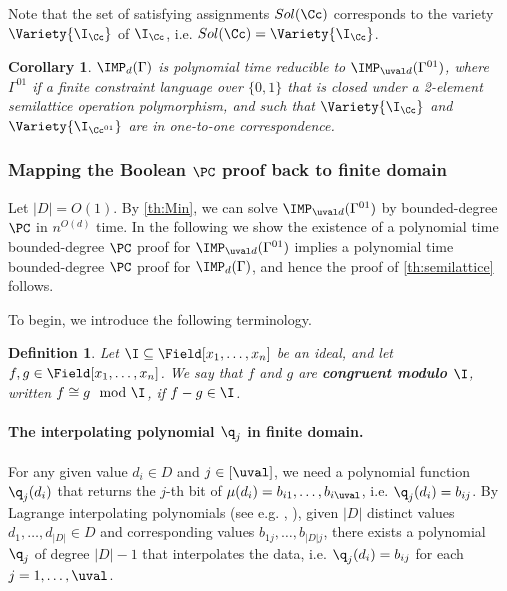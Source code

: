 \documentclass[11pt]{article}
\newtheorem{definition}[theorem]{Definition}
\newtheorem{corollary}[theorem]{Corollary}
\begin{document}
%
Note that the set of satisfying assignments $Sol(\Cc)$ corresponds to the variety $\Variety{\I_\Cc}$ of $\I_\Cc$, i.e. $Sol(\Cc)=\Variety{\I_\Cc}$. 
\begin{corollary}\label{th:imp_red}
 $\IMP_d(\Gamma)$ is polynomial time reducible to $\IMP_{\uval d}(\Gamma^{01})$, where $\Gamma^{01}$ if a finite constraint language over $\{0, 1\}$ that is closed under  a 2-element semilattice operation polymorphism, and such that $\Variety{\I_\Cc}$ and $\Variety{\I_{\Cc^{01}}}$ are in one-to-one correspondence. 
\end{corollary}

\subsubsection[Mapping the Boolean PC proof back to finite domain]{Mapping the Boolean $\PC$ proof back to finite domain}\label{sect:mappingBack}
Let $|D|=O(1)$. By \cref{th:Min}, we can solve $\IMP_{\uval d}(\Gamma^{01})$ by bounded-degree $\PC$ in $n^{O(d)}$ time. In the following we show the existence of a polynomial time bounded-degree $\PC$ proof for $\IMP_{\uval d}(\Gamma^{01})$ implies a polynomial time bounded-degree $\PC$ proof for $\IMP_{d}(\Gamma)$, and hence the proof of \cref{th:semilattice} follows.

To begin, we introduce the following terminology.
%
\begin{definition}
    Let $\I\subseteq \Field[x_1, \ldots, x_n]$ be an ideal, and let $f,g\in \Field[x_1, \ldots, x_n]$. We say that $f$ and $g$ are \textbf{\emph{congruent modulo $\I$}}, written $f\cong g \mod{\I}$, if $f-g\in \I$.
\end{definition}

\paragraph{The interpolating polynomial $\q_j$ in finite domain.}
For any given value $d_i\in D$ and $j\in [\uval]$, we need a polynomial function $\q_j(d_i)$ that returns the $j$-th bit of $\mu(d_i)=b_{i1},\ldots,b_{i\uval}$, i.e. $\q_j(d_i)=b_{ij}$.
%
By Lagrange interpolating polynomials (see e.g. \cite{phillips2003interpolation}, \cite{Gasca2000-hx}), given $|D|$ distinct values  $d_1,\ldots,d_{|D|}\in D$ and corresponding values $b_{1j},\ldots,b_{|D|j}$, there exists a polynomial $\q_j$ of degree $|D|-1$ that interpolates the data, i.e. $\q_j(d_i)=b_{ij}$ for each $j=1,\ldots,\uval$.
\end{document}

